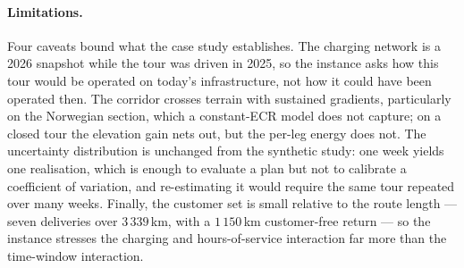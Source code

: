 \paragraph{Limitations.}
Four caveats bound what the case study establishes.  The charging network is a
2026 snapshot while the tour was driven in 2025, so the instance asks how this
tour would be operated on today's infrastructure, not how it could have been
operated then.  The corridor crosses terrain with sustained gradients,
particularly on the Norwegian section, which a constant-ECR model does not
capture; on a closed tour the elevation gain nets out, but the per-leg energy
does not.  The uncertainty distribution is unchanged from the synthetic study:
one week yields one realisation, which is enough to evaluate a plan but not to
calibrate a coefficient of variation, and re-estimating it would require the
same tour repeated over many weeks.  Finally, the customer set is small
relative to the route length --- seven deliveries over $3\,339$\,km, with a
$1\,150$\,km customer-free return --- so the instance stresses the
charging and hours-of-service interaction far more than the time-window
interaction.

